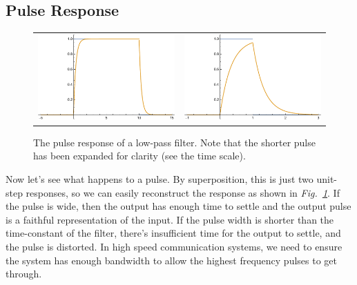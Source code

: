 \subsection{Pulse Response}
\begin{figure}[tb]
\centering
\begin{tabular}{cc}
\includegraphics[width=.4\columnwidth]{long_pulse.pdf} &
\includegraphics[width=.4\columnwidth]{fast_pulse.pdf} \\
\end{tabular}
\caption{The pulse response of a low-pass filter.  Note that the shorter pulse has been expanded for clarity (see the time scale). }
\label{fig:pulse_resp}
\end{figure}
Now let's see what happens to a pulse.  By superposition, this is just two unit-step responses, so we can easily reconstruct the response as shown in \emph{Fig.~\ref{fig:pulse_resp}}.  If the pulse is wide, then the output has enough time to settle and the output pulse is a faithful representation of the input.  If the pulse width is shorter than the time-constant of the filter, there's insufficient time for the output to settle, and the pulse is distorted.  In high speed communication systems, we need to ensure the system has enough bandwidth to allow the highest frequency pulses to get through.  

